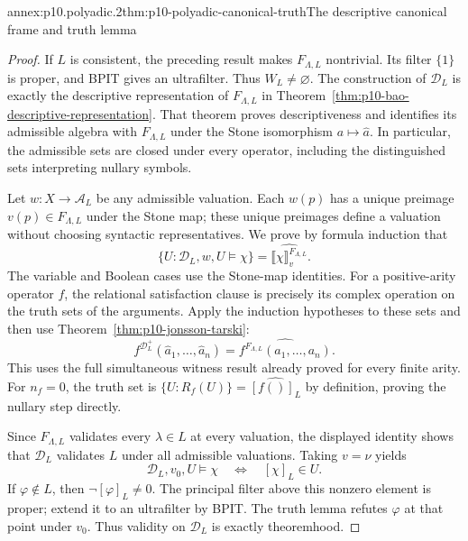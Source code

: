 \begin{annexitem}{annex:p10.polyadic.2}{thm:p10-polyadic-canonical-truth}{The descriptive canonical frame and truth lemma}
\begin{proof}
If \(L\) is consistent, the preceding result makes
\(F_{\Lambda,L}\) nontrivial.  Its filter \(\{1\}\) is proper,
and BPIT gives an ultrafilter.  Thus \(W_L\ne\varnothing\).
The construction of \(\mathcal D_L\) is exactly the descriptive
representation of \(F_{\Lambda,L}\) in
Theorem~\ref{thm:p10-bao-descriptive-representation}.
That theorem proves descriptiveness and identifies its admissible
algebra with \(F_{\Lambda,L}\) under the Stone isomorphism
\(a\mapsto\widehat a\).
In particular, the admissible sets are closed under every operator,
including the distinguished sets interpreting nullary symbols.

Let \(w:X\to\mathcal A_L\) be any admissible valuation.
Each \(w(p)\) has a unique preimage \(v(p)\in F_{\Lambda,L}\)
under the Stone map; these unique preimages define a valuation
without choosing syntactic representatives.
We prove by formula induction that
\[
 \{U:\mathcal D_L,w,U\models\chi\}
             =\widehat{\llbracket\chi\rrbracket_v^{F_{\Lambda,L}}}.
\]
The variable and Boolean cases use the Stone-map identities.
For a positive-arity operator \(f\), the relational satisfaction
clause is precisely its complex operation on the truth sets of
the arguments.  Apply the induction hypotheses to these sets and
then use Theorem~\ref{thm:p10-jonsson-tarski}:
\[
 f^{\mathcal D_L^+}(\widehat a_1,\ldots,\widehat a_n)
          =\widehat{f^{F_{\Lambda,L}}(a_1,\ldots,a_n)}.
\]
This uses the full simultaneous witness result already proved for
every finite arity.  For \(n_f=0\), the truth set is
\(\{U:R_f(U)\}=\widehat{[f()]_L}\) by definition, proving the
nullary step directly.

Since \(F_{\Lambda,L}\) validates every \(\lambda\in L\) at every
valuation, the displayed identity shows that \(\mathcal D_L\)
validates \(L\) under all admissible valuations.
Taking \(v=\nu\) yields
\[
 \mathcal D_L,v_0,U\models\chi
       \quad\Longleftrightarrow\quad[\chi]_L\in U.
\]
If \(\varphi\notin L\), then \(\neg[\varphi]_L\ne0\).
The principal filter above this nonzero element is proper;
extend it to an ultrafilter by BPIT.
The truth lemma refutes \(\varphi\) at that point under \(v_0\).
Thus validity on \(\mathcal D_L\) is exactly theoremhood.
\end{proof}
\end{annexitem}

